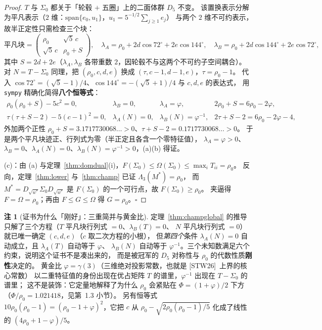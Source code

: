 \documentclass[UTF8,11pt]{ctexart}
\theoremstyle{definition}
\newtheorem{remark}[theorem]{注}
\newcommand{\Lam}{\Lambda}
\newcommand{\STW}{\textup{[STW26]}}
\begin{document}
\begin{proof}
$T$ 与 $\Sigma_0$ 都关于「轮毂 $+$ 五圈」上的二面体群 $D_5$ 不变。
该置换表示分解为平凡表示（$2$ 维：$\mathrm{span}\{e_0,u_1\}$，$u_1=5^{-1/2}\sum_{j\ge1}e_j$）
与两个 $2$ 维不可约表示，故半正定性只需检查三个块：
\[
\text{平凡块}=\begin{pmatrix}\rho_0&\sqrt5\,c\\[1pt]\sqrt5\,c&\rho_0+S\end{pmatrix},\quad
\lambda_A=\rho_0+2d\cos72^\circ+2e\cos144^\circ,\quad
\lambda_B=\rho_0+2d\cos144^\circ+2e\cos72^\circ,
\]
其中 $S=2d+2e$（$\lambda_A,\lambda_B$ 各带重数 $2$，因轮毂不与这两个不可约子空间耦合）。
对 $N=T-\Sigma_0$ 同理，把 $(\rho_0,c,d,e)$ 换成 $(\tau,c-1,d-1,e)$，$\tau=\rho_0-1$。
代入 $\cos72^\circ=(\sqrt5-1)/4$、$\cos144^\circ=-(\sqrt5+1)/4$ 与 $c,d,e$ 的表达式，
用 \texttt{sympy} 精确化简得\textbf{八个恒等式}：
\[
\begin{array}{llll}
\rho_0(\rho_0+S)-5c^2=0, & \lambda_B=0, & \lambda_A=\varphi, & 2\rho_0+S=6\rho_0-2\varphi,\\[2pt]
\tau(\tau+S-2)-5(c-1)^2=0, & \lambda_A(N)=0, & \lambda_B(N)=\varphi^{-1}, & 2\tau+S-2=6\rho_0-2\varphi-4,
\end{array}
\]
外加两个正性 $\rho_0+S=3.1717730068\ldots>0$、$\tau+S-2=0.1717730068\ldots>0$。
于是两个平凡块迹正、行列式为零（半正定且各含一个零特征值），
$\lambda_A=\varphi>0$、$\lambda_B=0$、$\lambda_A(N)=0$、$\lambda_B(N)=\varphi^{-1}>0$，(a)(b) 得证。

(c)：由 (a) 与定理~\ref{thm:domdual}(i)，$F(\Sigma_0)\le\Omega(\Sigma_0)\le\max_iT_{ii}=\rho_0$。
反向，定理~\ref{thm:lower} 与~\ref{thm:champ} 已证 $\Lam_3(M^*)=\rho_0$，
而 $M^*=D_{\sqrt{w^*}}\Sigma_0D_{\sqrt{w^*}}$ 是 $F(\Sigma_0)$ 的一个可行点，故 $F(\Sigma_0)\ge\rho_0$。
夹逼得 $F=\Omega=\rho_0$；再由 $F\le G\le\Omega$ 得 $G=\rho_0$。$\square$
\end{proof}

\begin{remark}[证书为什么「刚好」：三重简并与黄金比]\label{rmk:whyexact}
定理~\ref{thm:champglobal} 的推导只解了三个方程（$T$ 平凡块行列式 $=0$、$\lambda_B(T)=0$、
$N$ 平凡块行列式 $=0$）就已唯一确定 $(c,d,e)$（$c$ 取二次方程的小根），
但\emph{第四个}条件 $\lambda_A(N)=0$ 自动成立，且 $\lambda_A(T)$ 自动等于 $\varphi$、
$\lambda_B(N)$ 自动等于 $\varphi^{-1}$。三个未知数满足六个约束，说明这个证书不是凑出来的，
而是被冠军的 $D_5$ 对称性与 $\rho_0$ 的代数性质\textbf{刚性}决定的。
黄金比 $\varphi=\gamma(3)$（三维绝对投影常数，也就是 \STW\ 上界的核心常数）
以二重特征值的身份出现在优占矩阵 $T$ 的谱里，$\varphi^{-1}$ 出现在 $T-\Sigma_0$ 的谱里；
这不是装饰：它定量地解释了为什么 $\rho_0$ 会紧贴在 $\Phi=(1+\varphi)/2$ 下方
（$\Phi/\rho_0=1.021418$，见第~1.3 小节）。
另有恒等式 $10\rho_0(\rho_0-1)=(\rho_0-1+\varphi)^2$，它把 $c$ 从 $\rho_0-\sqrt{2\rho_0(\rho_0-1)/5}$
化成了线性的 $(4\rho_0+1-\varphi)/5$。
\end{remark}
\end{document}
